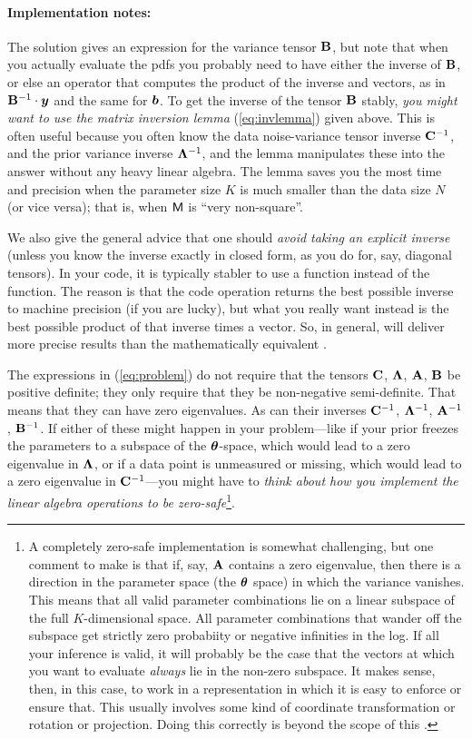 \paragraph{Implementation notes:}
The solution gives an expression for the variance tensor $\mathbf{B}$, but
note that when you actually evaluate the pdfs you probably need to
have either the inverse of $\mathbf{B}$, or else an operator that computes
the product of the inverse and vectors, as in $\mathbf{B}^{-1}\cdot\boldsymbol{y}$ and
the same for $\boldsymbol{b}$.
To get the inverse of the tensor $\mathbf{B}$ stably, \emph{you might want to use
the matrix inversion lemma} (\ref{eq:invlemma}) given above.
This is often useful because you often know the data noise-variance
tensor inverse $\mathbf{C}^{-1}$, and the prior variance inverse
$\mathbf{\Lambda}^{-1}$, and the lemma manipulates these into the answer without
any heavy linear algebra.
The lemma saves you the most time and precision when the parameter size $K$
is much smaller than the data size $N$ (or vice versa); that is, when $\mathsf{M}$
is ``very non-square''.

We also give the general advice that one should \emph{avoid taking an explicit
inverse} (unless you know the inverse exactly in closed form, as you do
for, say, diagonal tensors).
In your code, it is typically stabler to use a  function instead
of the  function.
The reason is that the code operation  returns the best
possible inverse to machine precision (if you are lucky), but what you
really want instead is the best possible product of that inverse times
a vector.
So, in general,  will deliver more precise results than
the mathematically equivalent .

The expressions in (\ref{eq:problem}) do not require that the tensors
$\mathbf{C}$, $\mathbf{\Lambda}$, $\mathbf{A}$, $\mathbf{B}$ be positive definite; they only require
that they be non-negative semi-definite.
That means that they can have zero eigenvalues.
As can their inverses $\mathbf{C}^{-1}$, $\mathbf{\Lambda}^{-1}$, $\mathbf{A}^{-1}$, $\mathbf{B}^{-1}$.
If either of these might happen in your problem---like if your prior
freezes the parameters to a subspace of the $\boldsymbol{\theta}$-space, which
would lead to a zero eigenvalue in $\mathbf{\Lambda}$, or if a data point is
unmeasured or missing, which would lead to a zero eigenvalue in
$\mathbf{C}^{-1}$---you might have to \emph{think about how you implement the
  linear algebra operations to be zero-safe}\footnote{A completely
  zero-safe implementation
  is somewhat challenging, but one comment to make is that if, say, $\mathbf{A}$
  contains a zero eigenvalue, then there is a direction in the parameter
  space (the $\boldsymbol{\theta}$ space) in which the variance vanishes. This means that
  all valid parameter combinations lie on a linear subspace of the full $K$-dimensional
  space. All parameter combinations that wander off the subspace get strictly
  zero probabiity or negative infinities in the log.
  If all your inference is valid, it will probably be the case that the
  vectors at which you want to evaluate \emph{always} lie in the non-zero
  subspace. It makes sense, then, in this case, to work in a representation in which it is easy
  to enforce or ensure that. This usually involves some kind of coordinate transformation
  or rotation or projection. Doing this correctly is beyond the scope of this \documentname.}.

